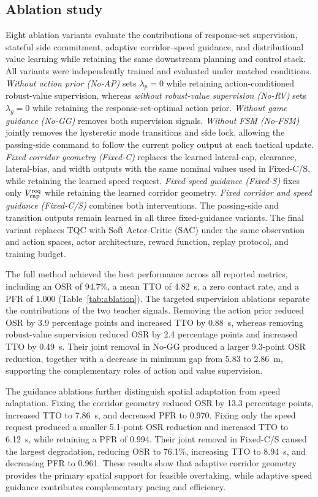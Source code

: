 \documentclass[journal,twoside,web]{ieeecolor}
\begin{document}
\subsection{Ablation study}
\label{subsec:ablation}

Eight ablation variants evaluate the contributions of response-set
supervision, stateful side commitment, adaptive corridor--speed guidance, and
distributional value learning while retaining the same downstream planning
and control stack. All variants were independently trained and evaluated under
matched conditions. \emph{Without action prior (No-AP)} sets
$\lambda_p=0$ while retaining action-conditioned robust-value supervision,
whereas \emph{without robust-value supervision (No-RV)} sets
$\lambda_g=0$ while retaining the response-set-optimal action prior.
\emph{Without game guidance (No-GG)} removes both supervision signals.
\emph{Without FSM (No-FSM)} jointly removes the hysteretic mode transitions
and side lock, allowing the passing-side command to follow the current policy
output at each tactical update. \emph{Fixed corridor geometry (Fixed-C)}
replaces the learned lateral-cap, clearance, lateral-bias, and width outputs
with the same nominal values used in Fixed-C/S, while retaining the learned
speed request. \emph{Fixed speed guidance (Fixed-S)} fixes only
$V_{\rm cap}^{\rm req}$ while retaining the learned corridor geometry.
\emph{Fixed corridor and speed guidance (Fixed-C/S)} combines both
interventions. The passing-side and transition outputs remain learned in all
three fixed-guidance variants. The final variant replaces TQC with Soft
Actor-Critic (SAC) under the same observation and action spaces, actor
architecture, reward function, replay protocol, and training budget.



The full method achieved the best performance across all reported metrics,
including an OSR of 94.7\%, a mean TTO of 4.82~s, a zero contact rate, and a
PFR of 1.000 (Table~\ref{tab:ablation}). The targeted supervision ablations
separate the contributions of the two teacher signals. Removing the action
prior reduced OSR by 3.9 percentage points and increased TTO by 0.88~s,
whereas removing robust-value supervision reduced OSR by 2.4 percentage
points and increased TTO by 0.49~s. Their joint removal in No-GG produced a
larger 9.3-point OSR reduction, together with a decrease in minimum gap from
5.83 to 2.86~m, supporting the complementary roles of action and value
supervision.

The guidance ablations further distinguish spatial adaptation from speed
adaptation. Fixing the corridor geometry reduced OSR by 13.3 percentage points,
increased TTO to 7.86~s, and decreased PFR to 0.970. Fixing only the speed
request produced a smaller 5.1-point OSR reduction and increased TTO to
6.12~s, while retaining a PFR of 0.994. Their joint removal in Fixed-C/S
caused the largest degradation, reducing OSR to 76.1\%, increasing TTO to
8.94~s, and decreasing PFR to 0.961. These results show that adaptive corridor
geometry provides the primary spatial support for feasible overtaking, while
adaptive speed guidance contributes complementary pacing and efficiency.
\end{document}
